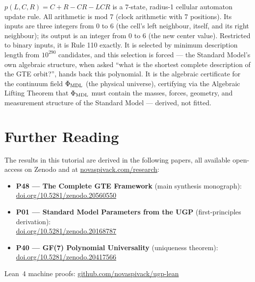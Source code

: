 \documentclass[11pt,a4paper]{article}
\begin{document}
\bigskip
\begin{tcolorbox}[colback=boxblue,colframe=blue!40!black,
  title=One-paragraph summary]
\textbf{$p(L,C,R) = C + R - CR - LCR$} is a 7-state, radius-1 cellular
automaton update rule.  All arithmetic is mod 7 (clock arithmetic with 7
positions).  Its inputs are three integers from 0 to 6 (the cell's left
neighbour, itself, and its right neighbour); its output is an integer from 0
to 6 (the new center value).  Restricted to binary inputs, it is Rule 110
exactly.  It is selected by minimum description length from $10^{290}$
candidates, and this selection is forced — the Standard Model's own algebraic
structure, when asked ``what is the shortest complete description of the GTE
orbit?'', hands back this polynomial.  It is the algebraic certificate for
the continuum field $\Phi_{\rm MDL}$ (the physical universe), certifying via
the Algebraic Lifting Theorem that $\Phi_{\rm MDL}$ must contain the masses,
forces, geometry, and measurement structure of the Standard Model --- derived,
not fitted.
\end{tcolorbox}


\section*{Further Reading}
\begin{tcolorbox}[colback=orange!8,colframe=orange!50!black,
  title=\textbf{Primary Sources}]
The results in this tutorial are derived in the following papers,
all available open-access on Zenodo and at
\href{https://novaspivack.com/research}{novaspivack.com/research}:
\begin{itemize}
  \item \textbf{P48 --- The Complete GTE Framework} (main synthesis monograph):\\
        \href{https://doi.org/10.5281/zenodo.20560550}{doi.org/10.5281/zenodo.20560550}
  \item \textbf{P01 --- Standard Model Parameters from the UGP} (first-principles derivation):\\
        \href{https://doi.org/10.5281/zenodo.20168787}{doi.org/10.5281/zenodo.20168787}
  \item \textbf{P40 --- GF(7) Polynomial Universality} (uniqueness theorem):\\
        \href{https://doi.org/10.5281/zenodo.20417566}{doi.org/10.5281/zenodo.20417566}
\end{itemize}
Lean~4 machine proofs: \href{https://github.com/novaspivack/ugp-lean}{github.com/novaspivack/ugp-lean}
\end{tcolorbox}


\end{document}
